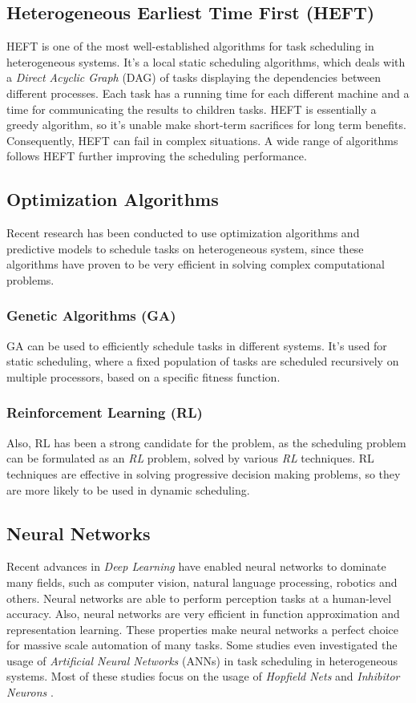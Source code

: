 \subsection{Heterogeneous Earliest Time First (HEFT)}
HEFT \cite{993206} is one of the most well-established algorithms for task scheduling in heterogeneous systems. It's a local static scheduling algorithms, which deals with a \emph{Direct Acyclic Graph} (DAG) of tasks displaying the dependencies between different processes. Each task has a running time for each different machine and a time for communicating the results to children tasks. HEFT is essentially a greedy algorithm, so it's unable make short-term sacrifices for long term benefits. Consequently, HEFT can fail in complex situations. A wide range of algorithms \cite{inbook} follows HEFT further improving the scheduling performance.

\subsection{Optimization Algorithms}
Recent research has been conducted to use optimization algorithms and predictive models to schedule tasks on heterogeneous system, since these algorithms have proven to be very efficient in solving complex computational problems. 
\subsubsection{Genetic Algorithms (GA)}
GA \cite{article2} can be used to efficiently schedule tasks in different systems. It's used for static scheduling, where a fixed population of tasks are scheduled recursively on multiple processors, based on a specific fitness function.
\subsubsection{Reinforcement Learning (RL)}
Also, RL \cite{ORHEAN2018292} has been a strong candidate for the problem, as the scheduling problem can be formulated as an \emph{RL} problem, solved by various \emph{RL} techniques. RL techniques are effective in solving progressive decision making problems, so they are more likely to be used in dynamic scheduling.

\subsection{Neural Networks}
Recent advances in \emph{Deep Learning} have enabled neural networks to dominate many fields, such as computer vision, natural language processing, robotics and others. Neural networks are able to perform perception tasks at a human-level accuracy. Also, neural networks are very efficient in function approximation and representation learning. These properties make neural networks a perfect choice for massive scale automation of many tasks. Some studies even investigated the usage of \emph{Artificial Neural Networks} (ANNs) \cite{article3} in task scheduling in heterogeneous systems. Most of these studies focus on the usage of \emph{Hopfield Nets} \cite{sathasivam2008logic} and \emph{Inhibitor Neurons} \cite{article3}. \\

